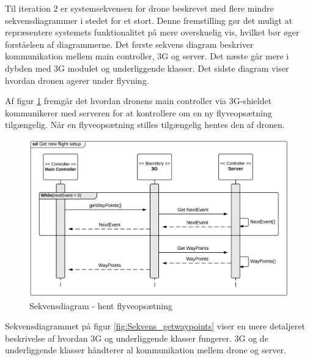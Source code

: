 Til iteration 2 er systemsekvensen for drone beskrevet med flere mindre sekvensdiagrammer i stedet for et stort. Denne fremstilling gør det muligt at repræsentere systemets funktionalitet på mere overskuelig vis, hvilket bør øger forståelsen af diagrammerne. Det første sekvens diagram beskriver kommunikation mellem main controller, 3G og server. Det næste går mere i dybden med 3G modulet og underliggende klasser. Det sidste diagram viser hvordan dronen agerer under flyvning.


Af figur \ref{fig:Sekvens_diagram_iteration2_2} fremgår det hvordan dronens main controller via 3G-shieldet kommunikerer med serveren for at kontrollere om en ny flyveopsætning tilgængelig. Når en flyveopsætning stilles tilgængelig hentes den af dronen. 

\begin{figure}[H]
	\centering
	\includegraphics[width=1\textwidth]{Billeder/sekvens/sekvens_iteration2_2}
	\caption{Sekvensdiagram - hent flyveopsætning}
	\label{fig:Sekvens_diagram_iteration2_2}
\end{figure}

\newpage

Sekvensdiagrammet på figur \ref{fig:Sekvens_getwaypoints} viser en mere detaljeret beskrivelse af hvordan 3G og underliggende klasser fungerer. 3G og de underliggende klasser håndterer al kommunikation mellem drone og server.

